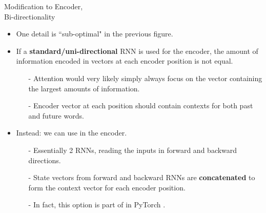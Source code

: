 \begin{frame}{Modification to Encoder,\\Bi-directionality}
\begin{itemize}
\item One detail is ``sub-optimal" in the previous figure.
\item If a \textbf{standard/uni-directional} RNN is used for the encoder, the amount of information encoded in vectors at each encoder position is not equal.
\begin{itemize}
\item[-] Attention would very likely simply always focus on the vector containing the largest amounts of information.
\item[-] Encoder vector at each position should contain contexts for both past and future words.
\end{itemize}
\pause
\item Instead: we can use  in the encoder.
\begin{itemize}
\item[-] Essentially 2 RNNs, reading the inputs in forward and backward directions.
\item[-] State vectors from forward and backward RNNs are \textbf{concatenated} to form the context vector for each encoder position.
\item[-] In fact, this option is part of  in PyTorch .
\end{itemize}
\end{itemize}
\end{frame}

